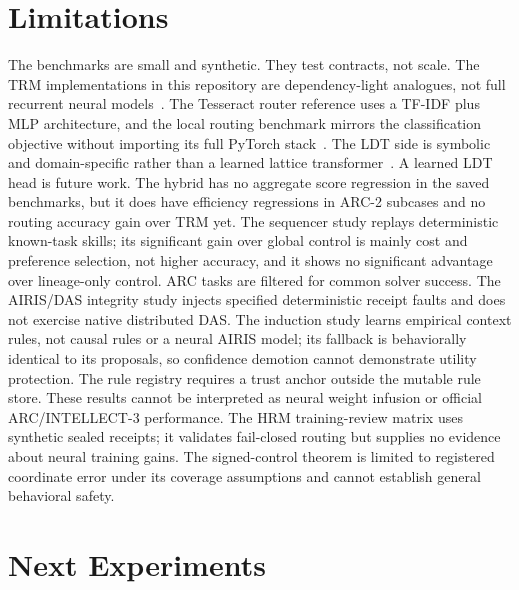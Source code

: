 \documentclass[11pt]{article}
\begin{document}
\section{Limitations}

The benchmarks are small and synthetic. They test contracts, not scale. The TRM implementations in this repository are dependency-light analogues, not full recurrent neural models~\cite{wang2025hrm,jolicoeurmartineau2025trm}. The Tesseract router reference uses a TF-IDF plus MLP architecture, and the local routing benchmark mirrors the classification objective without importing its full PyTorch stack~\cite{tesseract2026router}. The LDT side is symbolic and domain-specific rather than a learned lattice transformer~\cite{davis2026ldt}. A learned LDT head is future work. The hybrid has no aggregate score regression in the saved benchmarks, but it does have efficiency regressions in ARC-2 subcases and no routing accuracy gain over TRM yet. The sequencer study replays deterministic known-task skills; its significant gain over global control is mainly cost and preference selection, not higher accuracy, and it shows no significant advantage over lineage-only control. ARC tasks are filtered for common solver success. The AIRIS/DAS integrity study injects specified deterministic receipt faults and does not exercise native distributed DAS. The induction study learns empirical context rules, not causal rules or a neural AIRIS model; its fallback is behaviorally identical to its proposals, so confidence demotion cannot demonstrate utility protection. The rule registry requires a trust anchor outside the mutable rule store. These results cannot be interpreted as neural weight infusion or official ARC/INTELLECT-3 performance. The HRM training-review matrix uses synthetic sealed receipts; it validates fail-closed routing but supplies no evidence about neural training gains. The signed-control theorem is limited to registered coordinate error under its coverage assumptions and cannot establish general behavioral safety.

\section{Next Experiments}
\end{document}
